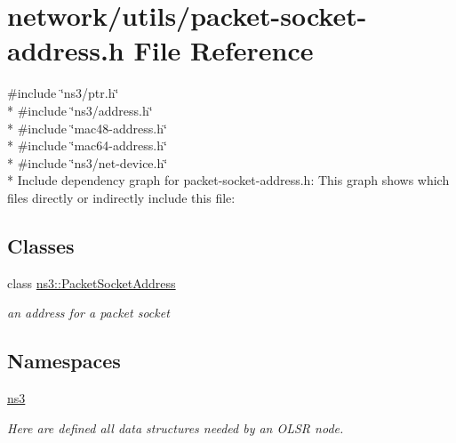 \hypertarget{packet-socket-address_8h}{}\section{network/utils/packet-\/socket-\/address.h File Reference}
\label{packet-socket-address_8h}
{\ttfamily \#include \char`\"{}ns3/ptr.\+h\char`\"{}}\\*
{\ttfamily \#include \char`\"{}ns3/address.\+h\char`\"{}}\\*
{\ttfamily \#include \char`\"{}mac48-\/address.\+h\char`\"{}}\\*
{\ttfamily \#include \char`\"{}mac64-\/address.\+h\char`\"{}}\\*
{\ttfamily \#include \char`\"{}ns3/net-\/device.\+h\char`\"{}}\\*
Include dependency graph for packet-\/socket-\/address.h\+:
This graph shows which files directly or indirectly include this file\+:
\subsection*{Classes}
\begin{DoxyCompactItemize}
\item 
class \hyperlink{classns3_1_1PacketSocketAddress}{ns3\+::\+Packet\+Socket\+Address}
\begin{DoxyCompactList}\small\item\em an address for a packet socket \end{DoxyCompactList}\end{DoxyCompactItemize}
\subsection*{Namespaces}
\begin{DoxyCompactItemize}
\item 
 \hyperlink{namespacens3}{ns3}
\begin{DoxyCompactList}\small\item\em Here are defined all data structures needed by an O\+L\+SR node. \end{DoxyCompactList}\end{DoxyCompactItemize}

